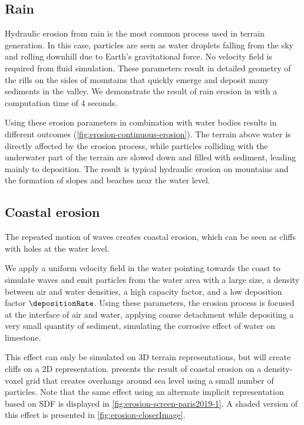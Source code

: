 \subsection{Rain}

Hydraulic erosion from rain is the most common process used in terrain generation. In this case, particles are seen as water droplets falling from the sky and rolling downhill due to Earth's gravitational force. No velocity field is required from fluid simulation. These parameters result in detailed geometry of the rills on the sides of mountains that quickly emerge and deposit many sediments in the valley.  
We demonstrate the result of rain erosion in  with a computation time of 4 seconds.  

Using these erosion parameters in combination with water bodies results in different outcomes (\cref{fig:erosion-continuous-erosion}). The terrain above water is directly affected by the erosion process, while particles colliding with the underwater part of the terrain are slowed down and filled with sediment, leading mainly to deposition. The result is typical hydraulic erosion on mountains and the formation of slopes and beaches near the water level.

\subsection{Coastal erosion}

The repeated motion of waves creates coastal erosion, which can be seen as cliffs with holes at the water level.

We apply a uniform velocity field in the water pointing towards the coast to simulate waves and emit particles from the water area with a large size, a density between air and water densities, a high capacity factor, and a low deposition factor $\depositionRate$. Using these parameters, the erosion process is focused at the interface of air and water, applying coarse detachment while depositing a very small quantity of sediment, simulating the corrosive effect of water on limestone. 

This effect can only be simulated on 3D terrain representations, but will create cliffs on a 2D representation.  
 presents the result of coastal erosion on a density-voxel grid that creates overhangs around sea level using a small number of particles. Note that the same effect using an alternate implicit representation based on SDF is displayed in \cref{fig:erosion-screen-paris2019-1}.  
A shaded version of this effect is presented in \cref{fig:erosion-closerImage}.

